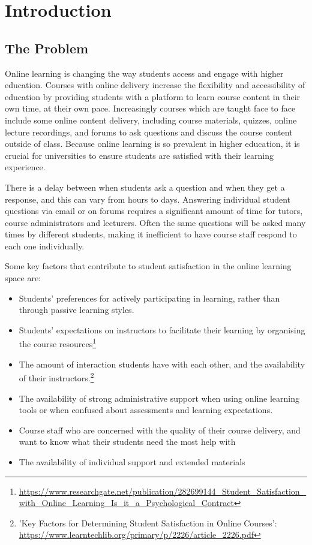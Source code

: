 \section{Introduction}

\subsection{The Problem}
Online learning is changing the way students access and engage with higher education. Courses with online delivery increase the flexibility and accessibility of education by providing students with a platform to learn course content in their own time, at their own pace. Increasingly courses which are taught face to face include some online content delivery, including course materials, quizzes, online lecture recordings, and forums to ask questions and discuss the course content outside of class. Because online learning is so prevalent in higher education, it is crucial for universities to ensure students are satisfied with their learning experience. 

There is a delay between when students ask a question and when they get a response, and this can vary from hours to days. Answering individual student questions via email or on forums requires a significant amount of time for tutors, course administrators and lecturers. Often the same questions will be asked many times by different students, making it inefficient to have course staff respond to each one individually.

Some key factors that contribute to student satisfaction in the online learning space are:
\begin{itemize}
  \item Students' preferences for actively participating in learning, rather than through passive learning styles.
  \item Students' expectations on instructors to facilitate their learning by organising the course resources\footnote{\url{https://www.researchgate.net/publication/282699144\_Student\_Satisfaction\_with\_Online\_Learning\_Is\_it\_a\_Psychological\_Contract}}
  \item The amount of interaction students have with each other, and the availability of their instructors.\footnote{'Key Factors for Determining Student Satisfaction in Online Courses': \url{https://www.learntechlib.org/primary/p/2226/article\_2226.pdf}}
  \item The availability of strong administrative support when using online learning tools or when confused about assessments and learning expectations.
  \item Course staff who are concerned with the quality of their course delivery, and want to know what their students need the most help with
  \item The availability of individual support and extended materials
\end{itemize}

